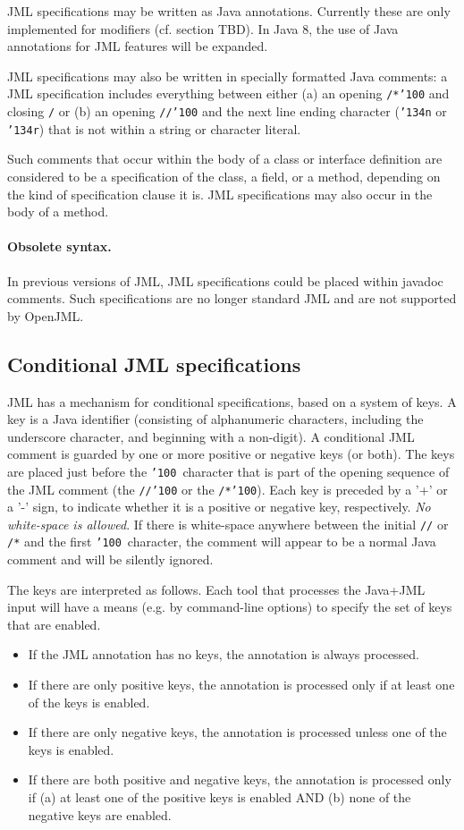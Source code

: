 \documentclass{report}%
\newcommand{\bs}{{\tt \char'134}}
\newcommand{\at}{{\tt \char'100}}
\begin{document}
JML specifications may be written as Java annotations. Currently these are only implemented for modifiers (cf. section TBD). In Java 8, the use of Java annotations for JML features will be expanded.

JML specifications may also be written in specially formatted Java comments:
a JML specification includes everything between either (a) an opening {\tt /*\at} and closing {\tt */}
or (b) an opening {\tt //\at} and the next line ending character ({\tt \bs n}
or {\tt \bs r}) that is not within a string or character literal.

Such comments that occur within the body of a class or interface definition are
considered to be a specification of the class, a field, or a method, depending on the
kind of specification clause it is. JML specifications may also occur in the body of 
a method.

\paragraph{Obsolete syntax.} In previous versions of JML, JML specifications could be placed
within javadoc comments. Such specifications are no longer standard JML and are not supported by OpenJML.

\subsection{Conditional JML specifications}

JML has a mechanism for conditional specifications, based on a system of keys.
A key is a Java identifier (consisting of alphanumeric characters, including the underscore character, and beginning with a non-digit).
A conditional JML comment is guarded by one or more positive or negative keys (or both).
The keys are placed just before the \at~character that is part of the opening sequence of the JML comment
(the {\tt //\at} or the {\tt /*\at}). Each key is preceded by a '+' or a '-' sign, to indicate whether it is a positive
or negative key, respectively. {\it No white-space is allowed}. If there is white-space anywhere between the
initial {\tt //} or {\tt /*} and the first \at~character, the comment will appear to be a normal Java comment and will be
silently ignored.

The keys are interpreted as follows. Each tool that processes the Java+JML input will have a means
(e.g. by command-line options) to specify the set of keys that are enabled.
\begin{itemize}
\item If the JML annotation has no keys, the annotation is always processed.
\item If there are only positive keys, the annotation is processed only if at least one of the keys is enabled.
\item If there are only negative keys, the annotation is processed unless one of the keys is enabled.
\item If there are both positive and negative keys, the annotation is processed only if (a) at least one of the
positive keys is enabled AND (b) none of the negative keys are enabled.
\end{itemize}
\end{document}
